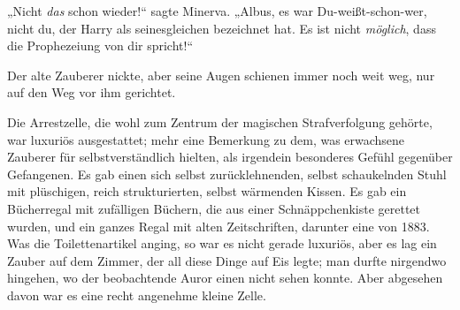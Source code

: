 „Nicht \emph{das} schon wieder!“ sagte Minerva. „Albus, es war Du-weißt-schon-wer, nicht du, der Harry als seinesgleichen bezeichnet hat. Es ist nicht \emph{möglich}, dass die Prophezeiung von dir spricht!“

Der alte Zauberer nickte, aber seine Augen schienen immer noch weit weg, nur auf den Weg vor ihm gerichtet.

\later

Die Arrestzelle, die wohl zum Zentrum der magischen Strafverfolgung gehörte, war luxuriös ausgestattet; mehr eine Bemerkung zu dem, was erwachsene Zauberer für selbstverständlich hielten, als irgendein besonderes Gefühl gegenüber Gefangenen. Es gab einen sich selbst zurücklehnenden, selbst schaukelnden Stuhl mit plüschigen, reich strukturierten, selbst wärmenden Kissen. Es gab ein Bücherregal mit zufälligen Büchern, die aus einer Schnäppchenkiste gerettet wurden, und ein ganzes Regal mit alten Zeitschriften, darunter eine von 1883. Was die Toilettenartikel anging, so war es nicht gerade luxuriös, aber es lag ein Zauber auf dem Zimmer, der all diese Dinge auf Eis legte; man durfte nirgendwo hingehen, wo der beobachtende Auror einen nicht sehen konnte. Aber abgesehen davon war es eine recht angenehme kleine Zelle.
